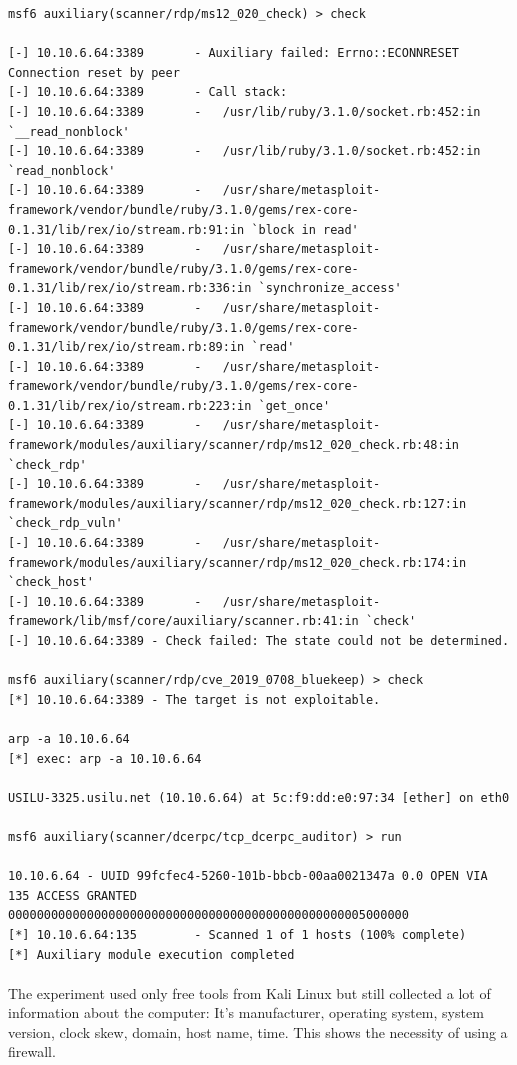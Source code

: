 \documentclass[mscthesis]{usiinfthesis}
\begin{document}
\begin{lstlisting}[language={},breaklines=true,postbreak=\mbox{\textcolor{red}{$\hookrightarrow$}\space}]
msf6 auxiliary(scanner/rdp/ms12_020_check) > check

[-] 10.10.6.64:3389       - Auxiliary failed: Errno::ECONNRESET Connection reset by peer
[-] 10.10.6.64:3389       - Call stack:
[-] 10.10.6.64:3389       -   /usr/lib/ruby/3.1.0/socket.rb:452:in `__read_nonblock'
[-] 10.10.6.64:3389       -   /usr/lib/ruby/3.1.0/socket.rb:452:in `read_nonblock'
[-] 10.10.6.64:3389       -   /usr/share/metasploit-framework/vendor/bundle/ruby/3.1.0/gems/rex-core-0.1.31/lib/rex/io/stream.rb:91:in `block in read'
[-] 10.10.6.64:3389       -   /usr/share/metasploit-framework/vendor/bundle/ruby/3.1.0/gems/rex-core-0.1.31/lib/rex/io/stream.rb:336:in `synchronize_access'
[-] 10.10.6.64:3389       -   /usr/share/metasploit-framework/vendor/bundle/ruby/3.1.0/gems/rex-core-0.1.31/lib/rex/io/stream.rb:89:in `read'
[-] 10.10.6.64:3389       -   /usr/share/metasploit-framework/vendor/bundle/ruby/3.1.0/gems/rex-core-0.1.31/lib/rex/io/stream.rb:223:in `get_once'
[-] 10.10.6.64:3389       -   /usr/share/metasploit-framework/modules/auxiliary/scanner/rdp/ms12_020_check.rb:48:in `check_rdp'
[-] 10.10.6.64:3389       -   /usr/share/metasploit-framework/modules/auxiliary/scanner/rdp/ms12_020_check.rb:127:in `check_rdp_vuln'
[-] 10.10.6.64:3389       -   /usr/share/metasploit-framework/modules/auxiliary/scanner/rdp/ms12_020_check.rb:174:in `check_host'
[-] 10.10.6.64:3389       -   /usr/share/metasploit-framework/lib/msf/core/auxiliary/scanner.rb:41:in `check'
[-] 10.10.6.64:3389 - Check failed: The state could not be determined.

msf6 auxiliary(scanner/rdp/cve_2019_0708_bluekeep) > check
[*] 10.10.6.64:3389 - The target is not exploitable.

arp -a 10.10.6.64
[*] exec: arp -a 10.10.6.64

USILU-3325.usilu.net (10.10.6.64) at 5c:f9:dd:e0:97:34 [ether] on eth0

msf6 auxiliary(scanner/dcerpc/tcp_dcerpc_auditor) > run

10.10.6.64 - UUID 99fcfec4-5260-101b-bbcb-00aa0021347a 0.0 OPEN VIA 135 ACCESS GRANTED 00000000000000000000000000000000000000000000000005000000
[*] 10.10.6.64:135        - Scanned 1 of 1 hosts (100% complete)
[*] Auxiliary module execution completed
\end{lstlisting}
\paragraph{}
The experiment used only free tools from Kali Linux but still collected a lot of information about the computer: It's manufacturer, operating system, system version, clock skew, domain, host name, time. This shows the necessity of using a firewall.
\end{document}
